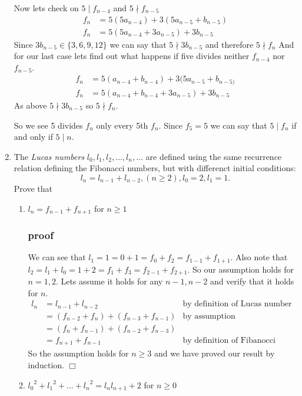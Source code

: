 \documentclass{article}
\begin{document}
\begin{enumerate}
Now lets check on $5\mid f_{n-4}$ and $5\nmid f_{n-5}$
\begin{align*}
  f_n&=5(5a_{n-4})+3(5a_{n-5}+b_{n-5})\\
  f_n&=5(5a_{n-4}+3a_{n-5})+3b_{n-5}
\end{align*}
Since $3b_{n-5}\in\{3,6,9,12\}$ we can say that $5\nmid 3b_{n-5}$ and therefore $5\nmid f_n$
And for our last case lets find out what happens if five divides neither $f_{n-4}$ nor $f_{n-5}$.
\begin{align*}
  f_n&=5(a_{n-4}+b_{n-4})+3(5a_{n-5}+b_{n-5)}\\
  f_n&=5(a_{n-4}+b_{n-4}+3a_{n-5})+3b_{n-5}
\end{align*}
As above $5\nmid 3b_{n-5}$ so $5\nmid f_n$.

So we see 5 divides $f_n$ only every 5th $f_n$. Since $f_5=5$ we can say that $5\mid f_n$ if and only if $5\mid n$.
\setcounter{enumi}{6}
\setcounter{enumi}{10}
\item
The \emph{Lucas numbers} $l_0,l_1,l_2,\dots,l_n,\dots$ are defined using the same recurrence relation defining the Fibonacci numbers, but with differenct initial conditions:
\[l_n=l_{n-1}+l_{n-2}, (n\ge2),l_0=2,l_1=1.\]
Prove that
\begin{enumerate}
\item
$l_n=f_{n-1}+f_{n+1}$ for $n\ge1$
\subsubsection*{proof}
We can see that $l_1=1=0+1=f_0+f_2=f_{1-1}+f_{1+1}$. Also note that $l_2=l_1+l_0=1+2=f_{1}+f_{3}=f_{2-1}+f_{2+1}$. So our assumption holds for $n=1,2$. Lets assume it holds for any $n-1, n-2$ and verify that it holds for $n$.
\begin{align*}
  l_n&=l_{n-1}+l_{n-2}&\text{by definition of Lucas number}\\
  &=(f_{n-2}+f_{n})+(f_{n-3}+f_{n-1})&\text{by assumption}\\
  &=(f_{n}+f_{n-1})+(f_{n-2}+f_{n-3})\\
  &=f_{n+1}+f_{n-1}&\text{by definition of Fibanocci number}
\end{align*}
So the assumption holds for $n\ge3$ and we have proved our result by induction. $\Box$
\item
${l_0}^2+{l_1}^2+\dots+{l_n}^2=l_nl_{n+1}+2$ for $n\ge0$

\end{enumerate}
\end{enumerate}
\end{document}
